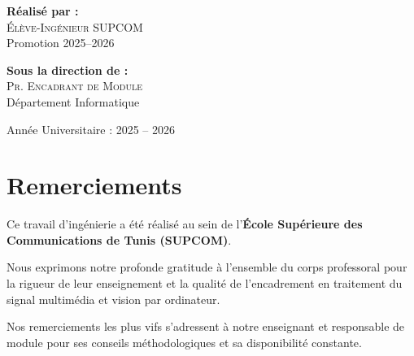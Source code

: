\documentclass[11pt,a4paper,oneside]{report}
\theoremstyle{definition}
\begin{document}
\begin{titlepage}
\begin{center}
        \vspace{1.0cm}
        
        \begin{minipage}{0.48\textwidth}
            \begin{flushleft} \normalsize
                \textbf{Réalisé par :}\\[0.15cm]
                \textsc{Élève-Ingénieur SUPCOM}\\[0.1cm]
                Promotion 2025--2026
            \end{flushleft}
        \end{minipage}
        \hfill
        \begin{minipage}{0.48\textwidth}
            \begin{flushright} \normalsize
                \textbf{Sous la direction de :}\\[0.15cm]
                \textsc{Pr. Encadrant de Module}\\[0.1cm]
                Département Informatique
            \end{flushright}
        \end{minipage}
        
        \vfill
        {\normalsize Année Universitaire : 2025 -- 2026}
    \end{center}
\end{titlepage}

\setcounter{page}{1}

\chapter*{Remerciements}

Ce travail d'ingénierie a été réalisé au sein de l'\textbf{École Supérieure des Communications de Tunis (SUPCOM)}.

Nous exprimons notre profonde gratitude à l'ensemble du corps professoral pour la rigueur de leur enseignement et la qualité de l'encadrement en traitement du signal multimédia et vision par ordinateur.

Nos remerciements les plus vifs s'adressent à notre enseignant et responsable de module pour ses conseils méthodologiques et sa disponibilité constante.
\end{document}
